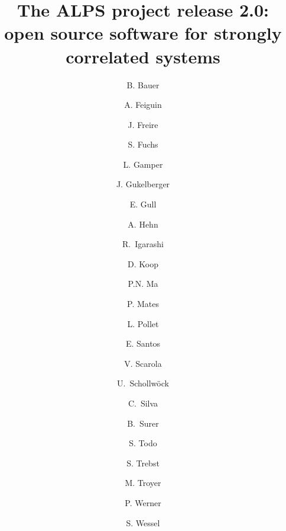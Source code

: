 \documentclass[3p,twocolumn]{elsarticle}
\begin{document}
\begin{frontmatter}

\title{The ALPS project release 2.0: \\ open source software for strongly correlated systems}

\author[eth]{B. Bauer} 
\author[wyoming]{A. Feiguin} 
\author[utah]{J. Freire} 
\author[goettingen]{S. Fuchs} 
\author[eth]{L. Gamper} 
\author[eth]{J. Gukelberger} 
\author[columbia]{E. Gull} 
\author[eth]{A. Hehn} 
\author[japan]{R.~Igarashi} 
\author[utah]{D. Koop} 
\author[eth]{P.N. Ma} 
\author[eth,utah]{P. Mates} 
\author[harvard,eth]{L. Pollet} 
\author[brazil,utah]{E. Santos} 
\author[virginia]{V. Scarola} 
\author[lmu]{U.~Schollw\"ock} 
\author[utah]{C.~Silva} 
\author[eth]{B.~Surer} 
\author[tokyo]{S. Todo} 
\author[stationq]{S. Trebst} 
\author[eth]{M. Troyer}
\author[eth]{P. Werner} 
\author[rwth,stuttgart]{S. Wessel} 

\address[eth]{Theoretische Physik, ETH Zurich, 8093 Zurich, Switzerland}
\address[wyoming]{}
\address[utah]{}
\address[goettingen]{Institut f\"ur Theoretische Physik, Georg-August-Universit\"{a}t G\"{o}ttingen, G\"{o}ttingen, Germany}
\address[columbia]{Columbia University, New York, NY 10027, USA}
\address[harvard]{} 
\address[brazil]{} 
\address[virginia]{}
\address[lmu]{}
\address[tokyo]{Department of Applied Physics, University of Tokyo, 113-8656 Tokyo, Japan}
\address[stationq]{Microsoft Research, Station Q, University of California, Santa Barbara, CA 93106, USA}
\address[rwth]{}
\address[stuttgart]{Institut f\"ur Theoretische Physik III, Universit\"at Stuttgart, Pfaffenwaldring 57, D-70550 Stuttgart, Germany}


\end{frontmatter}
\end{document}
